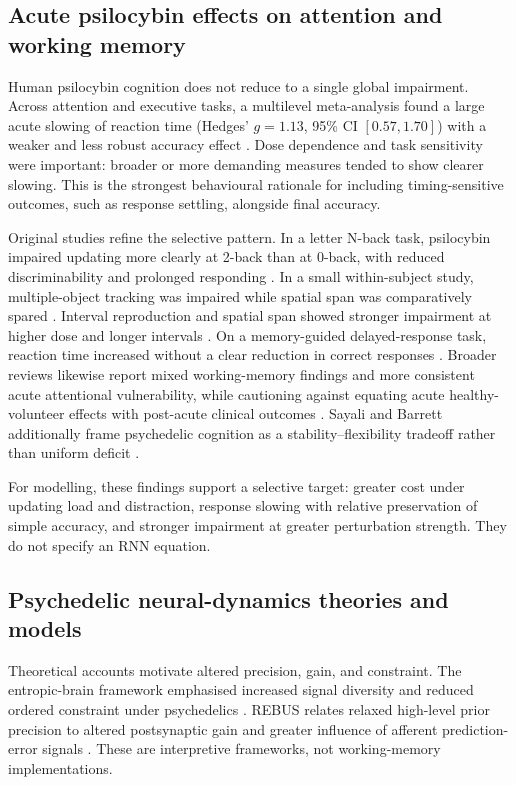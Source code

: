 \subsection{Acute psilocybin effects on attention and working memory}

Human psilocybin cognition does not reduce to a single global impairment.
Across attention and executive tasks, a multilevel meta-analysis found a large
acute slowing of reaction time (Hedges' $g=1.13$, 95\% CI $[0.57,1.70]$) with
a weaker and less robust accuracy effect \cite{yousefi2025}. Dose dependence
and task sensitivity were important: broader or more demanding measures tended
to show clearer slowing. This is the strongest behavioural rationale for
including timing-sensitive outcomes, such as response settling, alongside final
accuracy.

Original studies refine the selective pattern. In a letter N-back task,
psilocybin impaired updating more clearly at 2-back than at 0-back, with
reduced discriminability and prolonged responding \cite{barrett2018}. In a
small within-subject study, multiple-object tracking was impaired while spatial
span was comparatively spared \cite{carter2005}. Interval reproduction and
spatial span showed stronger impairment at higher dose and longer intervals
\cite{wittmann2007}. On a memory-guided delayed-response task, reaction time
increased without a clear reduction in correct responses
\cite{vollenweider1998}. Broader reviews likewise report mixed working-memory
findings and more consistent acute attentional vulnerability, while cautioning
against equating acute healthy-volunteer effects with post-acute clinical
outcomes \cite{meshkat2024,sayalibarrett2023}. Sayali and Barrett additionally
frame psychedelic cognition as a stability--flexibility tradeoff rather than
uniform deficit \cite{sayalibarrett2023}.

For modelling, these findings support a selective target: greater cost under
updating load and distraction, response slowing with relative preservation of
simple accuracy, and stronger impairment at greater perturbation strength.
They do not specify an RNN equation.

\subsection{Psychedelic neural-dynamics theories and models}

Theoretical accounts motivate altered precision, gain, and constraint. The
entropic-brain framework emphasised increased signal diversity and reduced
ordered constraint under psychedelics \cite{carhartharris2014}. REBUS relates
relaxed high-level prior precision to altered postsynaptic gain and greater
influence of afferent prediction-error signals \cite{carhartharris2019}. These
are interpretive frameworks, not working-memory implementations.

